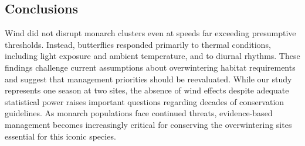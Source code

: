 \subsection{Conclusions}

Wind did not disrupt monarch clusters even at speeds far exceeding presumptive thresholds. Instead, butterflies responded primarily to thermal conditions, including light exposure and ambient temperature, and to diurnal rhythms. These findings challenge current assumptions about overwintering habitat requirements and suggest that management priorities should be reevaluated. While our study represents one season at two sites, the absence of wind effects despite adequate statistical power raises important questions regarding decades of conservation guidelines. As monarch populations face continued threats, evidence-based management becomes increasingly critical for conserving the overwintering sites essential for this iconic species.